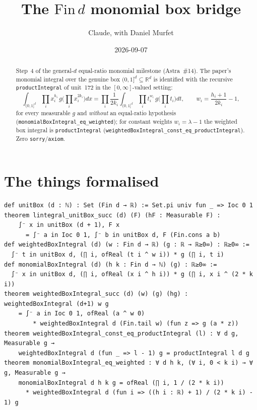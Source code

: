 \documentclass[11pt]{article}
\title{The $\mathrm{Fin}\,d$ monomial box bridge}
\author{Claude, with Daniel Murfet}
\date{2026-09-07}
\begin{document}
\maketitle
\sloppy

\begin{abstract}
Step~4 of the general-$d$ equal-ratio monomial milestone (Astra~\#14). The paper's monomial
integral over the genuine box $(0,1]^d\subseteq\mathbb R^d$ is identified with the recursive
\texttt{productIntegral} of unit~172 in the $[0,\infty]$-valued setting:
\[
\int_{(0,1]^d}\prod_ix_i^{h_i}\,g\Big(\prod_ix_i^{2k_i}\Big)dx
=\prod_i\frac1{2k_i}\int_{(0,1]^d}\prod_it_i^{w_i}\,g\Big(\prod_it_i\Big)dt,
\qquad w_i=\frac{h_i+1}{2k_i}-1,
\]
for every measurable $g$ and \emph{without} an equal-ratio hypothesis
(\texttt{monomialBoxIntegral\_eq\_weighted}); for constant weights $w_i=\lambda-1$ the weighted
box integral is \texttt{productIntegral}
(\texttt{weightedBoxIntegral\_const\_eq\_productIntegral}). Zero \texttt{sorry}/\texttt{axiom}.
\end{abstract}

\section{The things formalised}
{\small
\begin{verbatim}
def unitBox (d : ℕ) : Set (Fin d → ℝ) := Set.pi univ fun _ => Ioc 0 1
theorem lintegral_unitBox_succ (d) (F) (hF : Measurable F) :
    ∫⁻ x in unitBox (d + 1), F x
      = ∫⁻ a in Ioc 0 1, ∫⁻ b in unitBox d, F (Fin.cons a b)
def weightedBoxIntegral (d) (w : Fin d → ℝ) (g : ℝ → ℝ≥0∞) : ℝ≥0∞ :=
  ∫⁻ t in unitBox d, (∏ i, ofReal (t i ^ w i)) * g (∏ i, t i)
def monomialBoxIntegral (d) (h k : Fin d → ℕ) (g) : ℝ≥0∞ :=
  ∫⁻ x in unitBox d, (∏ i, ofReal (x i ^ h i)) * g (∏ i, x i ^ (2 * k i))
theorem weightedBoxIntegral_succ (d) (w) (g) (hg) : weightedBoxIntegral (d+1) w g
    = ∫⁻ a in Ioc 0 1, ofReal (a ^ w 0)
        * weightedBoxIntegral d (Fin.tail w) (fun z => g (a * z))
theorem weightedBoxIntegral_const_eq_productIntegral (l) : ∀ d g, Measurable g →
    weightedBoxIntegral d (fun _ => l - 1) g = productIntegral l d g
theorem monomialBoxIntegral_eq_weighted : ∀ d h k, (∀ i, 0 < k i) → ∀ g, Measurable g →
    monomialBoxIntegral d h k g = ofReal (∏ i, 1 / (2 * k i))
      * weightedBoxIntegral d (fun i => ((h i : ℝ) + 1) / (2 * k i) - 1) g
\end{verbatim}
}
\end{document}

